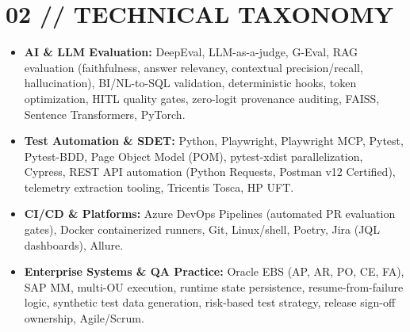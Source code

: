 \documentclass[10pt,a4paper]{article}
\begin{document}
\section*{02 // TECHNICAL TAXONOMY}
\small
\begin{itemize}[leftmargin=*,noitemsep,topsep=1pt]
    \item \textbf{AI \& LLM Evaluation:} DeepEval, LLM-as-a-judge, G-Eval, RAG evaluation (faithfulness, answer relevancy, contextual precision/recall, hallucination), BI/NL-to-SQL validation, deterministic hooks, token optimization, HITL quality gates, zero-logit provenance auditing, FAISS, Sentence Transformers, PyTorch.
    \item \textbf{Test Automation \& SDET:} Python, Playwright, Playwright MCP, Pytest, Pytest-BDD, Page Object Model (POM), pytest-xdist parallelization, Cypress, REST API automation (Python Requests, Postman v12 Certified), telemetry extraction tooling, Tricentis Tosca, HP UFT.
    \item \textbf{CI/CD \& Platforms:} Azure DevOps Pipelines (automated PR evaluation gates), Docker containerized runners, Git, Linux/shell, Poetry, Jira (JQL dashboards), Allure.
    \item \textbf{Enterprise Systems \& QA Practice:} Oracle EBS (AP, AR, PO, CE, FA), SAP MM, multi-OU execution, runtime state persistence, resume-from-failure logic, synthetic test data generation, risk-based test strategy, release sign-off ownership, Agile/Scrum.
\end{itemize}

\end{document}
